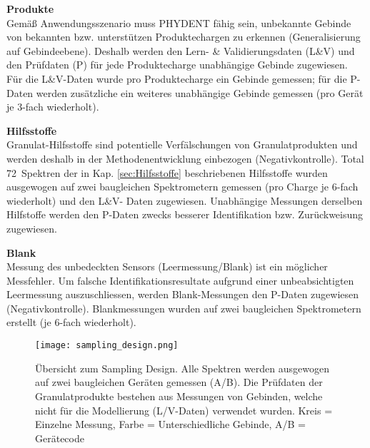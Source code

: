 \documentclass[11pt, a4paper]{article}
\newcommand\NrMatrix{72}
\begin{document}
\textbf{Produkte}\\[1.2pt]
Gemäß Anwendungsszenario muss PHYDENT fähig sein, unbekannte Gebinde von bekannten bzw. unterstützen Produktechargen zu erkennen (Generalisierung auf Gebindeebene). Deshalb werden den Lern- \& Validierungsdaten (L\&V) und den Prüfdaten (P) für jede Produktecharge unabhängige Gebinde zugewiesen. Für die L\&V-Daten wurde pro Produktecharge ein Gebinde gemessen; für die P-Daten werden zusätzliche ein weiteres unabhängige Gebinde gemessen (pro Gerät je 3-fach wiederholt).

\textbf{Hilfsstoffe}\\[1.2pt]
Granulat-Hilfsstoffe sind potentielle Verfälschungen von Granulatprodukten und werden deshalb in der Methodenentwicklung einbezogen (Negativkontrolle). Total \NrMatrix\ Spektren der in Kap. \ref{sec:Hilfsstoffe} beschriebenen Hilfsstoffe wurden ausgewogen auf zwei baugleichen Spektrometern gemessen (pro Charge je 6-fach wiederholt) und den L\&V- Daten zugewiesen. Unabhängige Messungen derselben Hilfstoffe werden den P-Daten zwecks besserer Identifikation bzw. Zurückweisung zugewiesen.

\textbf{Blank}\\[1.2pt]
Messung des unbedeckten Sensors (Leermessung/Blank) ist ein möglicher Messfehler. Um falsche Identifikationsresultate aufgrund einer unbeabsichtigten Leermessung auszuschliessen, werden Blank-Messungen den P-Daten zugewiesen (Negativkontrolle). Blankmessungen wurden auf zwei baugleichen Spektrometern erstellt (je 6-fach wiederholt).
 
\begin{figure}[h]
\begin{center}
\texttt{[image: sampling\_design.png]}
\end{center}
\caption{Übersicht zum Sampling Design. Alle Spektren werden ausgewogen auf zwei baugleichen Geräten gemessen (A/B). Die Prüfdaten der Granulatprodukte bestehen aus Messungen von Gebinden, welche nicht für die Modellierung (L/V-Daten) verwendet wurden.
Kreis = Einzelne Messung, Farbe = Unterschiedliche Gebinde, A/B = Gerätecode
}
\label{fig:Sampling_Design}
\end{figure}
\end{document}
